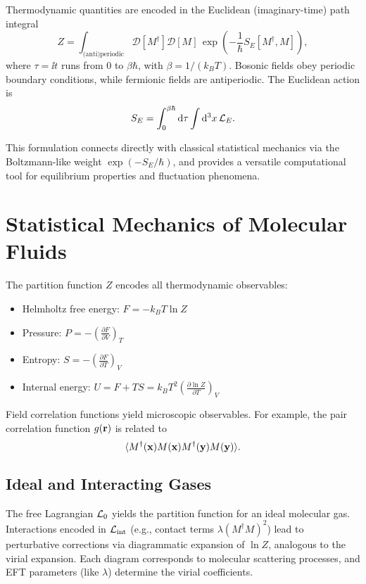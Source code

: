 Thermodynamic quantities are encoded in the Euclidean (imaginary-time) path integral
\begin{equation}
	Z = \int_{\text{(anti)periodic}} \mathcal{D}[M^\dagger] \mathcal{D}[M] \, \exp\left(-\frac{1}{\hbar} S_E[M^\dagger, M]\right),
	\label{eq:path_integral_euclidean}
\end{equation}
where \(\tau = \ii t\) runs from \(0\) to \(\beta\hbar\), with \(\beta = 1/(k_B T)\). Bosonic fields obey periodic boundary conditions, while fermionic fields are antiperiodic. The Euclidean action is
\[
S_E = \int_0^{\beta\hbar} \mathrm{d}\tau \int \mathrm{d}^3x \, \mathcal{L}_E.
\]

This formulation connects directly with classical statistical mechanics via the Boltzmann-like weight \(\exp(-S_E/\hbar)\), and provides a versatile computational tool for equilibrium properties and fluctuation phenomena.

\section{Statistical Mechanics of Molecular Fluids}
\label{sec:path_integral_statmech}

The partition function \(Z\) encodes all thermodynamic observables:
\begin{itemize}
	\item Helmholtz free energy: \(F = -k_B T \ln Z\)
	\item Pressure: \(P = -\left(\frac{\partial F}{\partial V}\right)_T\)
	\item Entropy: \(S = -\left(\frac{\partial F}{\partial T}\right)_V\)
	\item Internal energy: \(U = F + TS = k_B T^2 \left(\frac{\partial \ln Z}{\partial T}\right)_V\)
\end{itemize}

Field correlation functions yield microscopic observables. For example, the pair correlation function \(g(\vb{r})\) is related to
\[
\langle M^\dagger(\vb{x}) M(\vb{x}) M^\dagger(\vb{y}) M(\vb{y}) \rangle.
\]

\subsection{Ideal and Interacting Gases}

The free Lagrangian \(\mathcal{L}_0\) yields the partition function for an ideal molecular gas. Interactions encoded in \(\mathcal{L}_{\text{int}}\) (e.g., contact terms \(\lambda (M^\dagger M)^2\)) lead to perturbative corrections via diagrammatic expansion of \(\ln Z\), analogous to the virial expansion. Each diagram corresponds to molecular scattering processes, and EFT parameters (like \(\lambda\)) determine the virial coefficients.


